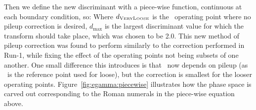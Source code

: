 Then we define the new discriminant with a piece-wise function, continuous at each boundary condition, so:
Where $d_{\mathrm{\text{V{\tiny ERY}L{\tiny OOSE}}}}$ is the \VeryLoose\ operating point where no pileup correction is desired, $d_{\text{max}}$ is the largest discriminant value for which the transform should take place, which was chosen to be 2.0.
This new method of pileup correction was found to perform similarly to the correction performed in Run-1, while fixing the effect of the operating points not being subsets of one another.
One small difference this introduces is that \Loose\ now depends on pileup (as \VeryLoose\ is the reference point used for loose), but the correction is smallest for the looser operating points.
Figure~\ref{fig:egamma:piecewise} illustrates how the phase space is carved out corresponding to the Roman numerals in the piece-wise equation above.


